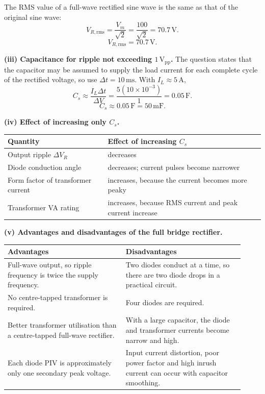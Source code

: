 \documentclass[11pt,a4paper]{article}
\newcommand{\rms}{\mathrm{rms}}
\newcommand{\unit}[1]{\,\mathrm{#1}}
\newcommand{\answerbox}[1]{\[\boxed{#1}\]}
\begin{document}
The RMS value of a full-wave rectified sine wave is the same as that of the original sine wave:
\[
V_{R,\rms}=\frac{V_m}{\sqrt{2}}=\frac{100}{\sqrt{2}}=70.7\unit{V}.
\]
\answerbox{V_{R,\rms}=70.7\unit{V}.}

\textbf{(iii) Capacitance for ripple not exceeding $1\unit{V_{pp}}$.} The question states that the capacitor may be assumed to supply the load current for each complete cycle of the rectified voltage, so use $\Delta t=10\unit{ms}$. With $I_L\approx 5\unit{A}$,
\[
C_s\approx \frac{I_L\Delta t}{\Delta V}
=\frac{5(10\times10^{-3})}{1}=0.05\unit{F}.
\]
\answerbox{C_s\approx 0.05\unit{F}=50\unit{mF}.}

\textbf{(iv) Effect of increasing only $C_s$.}
\begin{center}
\begin{tabular}{@{}ll@{}}
\toprule
Quantity & Effect of increasing $C_s$ \\
\midrule
Output ripple $\Delta V_R$ & decreases \\
Diode conduction angle & decreases; current pulses become narrower \\
Form factor of transformer current & increases, because the current becomes more peaky \\
Transformer VA rating & increases, because RMS current and peak current increase \\
\bottomrule
\end{tabular}
\end{center}

\textbf{(v) Advantages and disadvantages of the full bridge rectifier.}

\begin{center}
\begin{tabular}{@{}p{0.46\linewidth}p{0.46\linewidth}@{}}
\toprule
Advantages & Disadvantages \\
\midrule
Full-wave output, so ripple frequency is twice the supply frequency. & Two diodes conduct at a time, so there are two diode drops in a practical circuit. \\
No centre-tapped transformer is required. & Four diodes are required. \\
Better transformer utilisation than a centre-tapped full-wave rectifier. & With a large capacitor, the diode and transformer currents become narrow and high. \\
Each diode PIV is approximately only one secondary peak voltage. & Input current distortion, poor power factor and high inrush current can occur with capacitor smoothing. \\
\bottomrule
\end{tabular}
\end{center}
\end{document}
